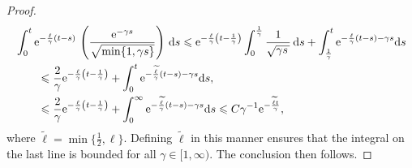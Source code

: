 \documentclass[11pt,a4paper]{article}
\begin{document}
\begin{proof}
\begin{align}
        &\int_{0}^{t} \mathrm{e}^{-\frac{\ell}{\gamma}(t-s)}  \, \left( \frac{\mathrm{e}^{-\gamma s}}{\sqrt{\min\{1, \gamma s\}}} \right) \, \mathrm d s
        \leqslant
        \mathrm{e}^{-\frac{\ell}{\gamma} \left(t-\frac{1}{\gamma}\right)}
         \int_{0}^{\frac{1}{\gamma}}  \frac{1}{\sqrt{\gamma s\, }} \, \mathrm d s
         + \int_{\frac{1}{\gamma}}^{t} \mathrm{e}^{-\frac{\ell}{\gamma}(t-s) - \gamma s} \mathrm d s \\
         \notag
        &\qquad \leqslant
        \frac{2}{\gamma}\mathrm{e}^{-\frac{\ell}{\gamma} \left(t-\frac{1}{\gamma}\right)}
         + \int_{0}^{t} \mathrm{e}^{-\frac{\widetilde \ell}{\gamma}(t-s) - \gamma s} \mathrm d s, \\
         \label{eq:bound_integral}
        &\qquad \leqslant
        \frac{2}{\gamma}\mathrm{e}^{-\frac{\ell}{\gamma} \left(t-\frac{1}{\gamma}\right)}
         + \int_{0}^{\infty} \mathrm{e}^{-\frac{\widetilde \ell}{\gamma}(t-s) - \gamma s} \mathrm d s
        \leqslant C  \gamma^{-1} \mathrm{e}^{-\frac{\widetilde \ell t}{\gamma}},
    \end{align}
    where $\widetilde \ell = \min \{\frac{1}{2}, \ell \}$.
    Defining $\widetilde \ell$ in this manner ensures that the integral on the last line is bounded for all $\gamma \in [1, \infty)$.
    The conclusion then follows.
\end{proof}
\end{document}
